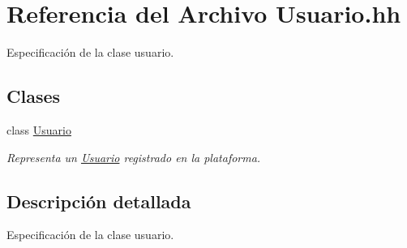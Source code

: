 \hypertarget{_usuario_8hh}{}\section{Referencia del Archivo Usuario.\+hh}
\label{_usuario_8hh}


Especificación de la clase usuario.  


\subsection*{Clases}
\begin{DoxyCompactItemize}
\item 
class \mbox{\hyperlink{class_usuario}{Usuario}}
\begin{DoxyCompactList}\small\item\em Representa un \mbox{\hyperlink{class_usuario}{Usuario}} registrado en la plataforma. \end{DoxyCompactList}\end{DoxyCompactItemize}


\subsection{Descripción detallada}
Especificación de la clase usuario. 

